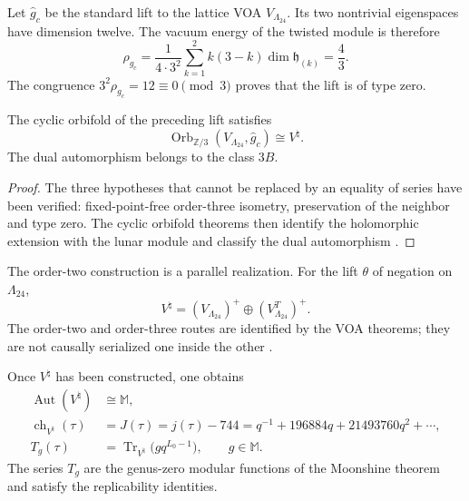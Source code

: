 Let \(\widehat g_c\) be the standard lift to the lattice VOA
\(V_{\Lambda_{24}}\). Its two nontrivial eigenspaces have dimension
twelve. The vacuum energy of the twisted module is therefore
\begin{equation}
 \rho_{g_c}
 =\frac1{4\cdot3^2}
 \sum_{k=1}^{2}k(3-k)\dim\mathfrak h_{(k)}
 =\frac43.
 \label{eq:exc-peso-torcido}
\end{equation}
The congruence \(3^2\rho_{g_c}=12\equiv0\pmod3\) proves that the lift
is of type zero.

\begin{theorem}
\label{thm:exc-orbifold}
The cyclic orbifold of the preceding lift satisfies
\begin{equation}
 \operatorname{Orb}_{\mathbb Z/3}
 (V_{\Lambda_{24}},\widehat g_c)\cong V^\natural.
 \label{eq:exc-orbifold}
\end{equation}
The dual automorphism belongs to the class \(3B\).
\end{theorem}

\begin{proof}
The three hypotheses that cannot be replaced by an equality of series
have been verified: fixed-point-free order-three isometry, preservation of the
neighbor and type zero. The cyclic orbifold theorems then identify
the holomorphic extension with the lunar module and classify the dual automorphism
\citep{ChenLamShimakura2016,AbeLamYamada2017,Carnahan2017}.
\end{proof}

The order-two construction is a parallel realization. For the lift
\(\theta\) of negation on \(\Lambda_{24}\),
\begin{equation}
 V^\natural=(V_{\Lambda_{24}})^+
 \oplus(V_{\Lambda_{24}}^T)^+.
 \label{eq:exc-flm}
\end{equation}
The order-two and order-three routes are identified by the VOA theorems; they are not
causally serialized one inside the other \citep{FLM1988}.

\begin{theorem}
\label{thm:exc-moonshine}
Once \(V^\natural\) has been constructed, one obtains
\begin{align}
 \operatorname{Aut}(V^\natural)&\cong\mathbb M,
 \label{eq:exc-aut-monster}\\
 \operatorname{ch}_{V^\natural}(\tau)
 &=J(\tau)=j(\tau)-744
 =q^{-1}+196884q+21493760q^2+\cdots,
 \label{eq:exc-caracter-j}\\
 T_g(\tau)&=\operatorname{Tr}_{V^\natural}
 \bigl(gq^{L_0-1}\bigr),\qquad g\in\mathbb M.
 \label{eq:exc-mckay-thompson}
\end{align}
The series \(T_g\) are the genus-zero modular functions of the Moonshine
theorem and satisfy the replicability identities.
\end{theorem}

